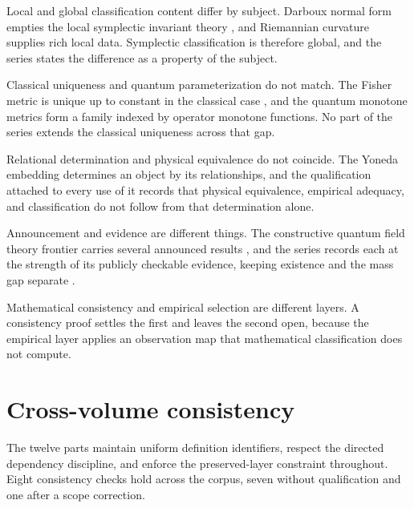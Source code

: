 \documentclass[11pt,letterpaper]{article}
\theoremstyle{definition}
\theoremstyle{remark}
\begin{document}
Local and global classification content differ by subject. Darboux normal form empties the local symplectic invariant theory \cite{corpus-6}, and Riemannian curvature supplies rich local data. Symplectic classification is therefore global, and the series states the difference as a property of the subject.

Classical uniqueness and quantum parameterization do not match. The Fisher metric is unique up to constant in the classical case \cite{corpus-52}, and the quantum monotone metrics form a family indexed by operator monotone functions. No part of the series extends the classical uniqueness across that gap.

Relational determination and physical equivalence do not coincide. The Yoneda embedding determines an object by its relationships, and the qualification attached to every use of it records that physical equivalence, empirical adequacy, and classification do not follow from that determination alone.

Announcement and evidence are different things. The constructive quantum field theory frontier carries several announced results \cite{corpus-24,corpus-25}, and the series records each at the strength of its publicly checkable evidence, keeping existence and the mass gap separate \cite{corpus-23}.

Mathematical consistency and empirical selection are different layers. A consistency proof settles the first and leaves the second open, because the empirical layer applies an observation map that mathematical classification does not compute.

\section{Cross-volume consistency}

The twelve parts maintain uniform definition identifiers, respect the directed dependency discipline, and enforce the preserved-layer constraint throughout. Eight consistency checks hold across the corpus, seven without qualification and one after a scope correction.
\end{document}
